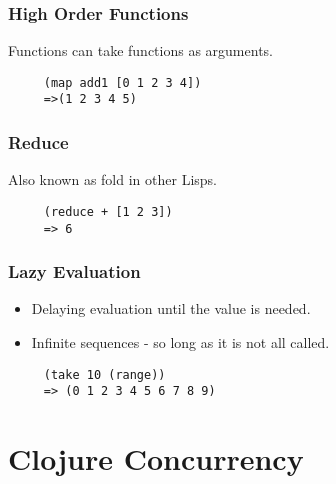 \documentclass{beamer}
\newcommand{\comment}[1]{{\bf \tt  {#1}}}
\newcommand{\hfcomment}[1]{\textcolor{Teal}{\comment{Henry: {#1}}}}
\begin{document}
\begin{frame}[fragile]
\frametitle{High Order Functions}
 Functions can take functions as arguments.
	\begin{verbatim}
	 (map add1 [0 1 2 3 4])
	 =>(1 2 3 4 5)
	\end{verbatim}
\end{frame}
\begin{frame}[fragile]
\frametitle{Reduce}
Also known as fold in other Lisps.
	\begin{verbatim}
	 (reduce + [1 2 3])
	 => 6
	\end{verbatim}
\end{frame}
\begin{frame}[fragile]
\frametitle{Lazy Evaluation}
	\begin{itemize}
	  \item Delaying evaluation until the value is needed.
  	  \item Infinite sequences - so long as it is not all called.
       \end{itemize}	
	\begin{verbatim}
	 (take 10 (range))
	 => (0 1 2 3 4 5 6 7 8 9)
	\end{verbatim}
\end{frame}

\section{Clojure Concurrency}
\end{document}
